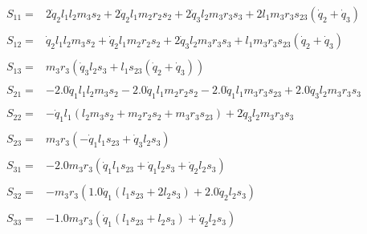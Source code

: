 \begin{align}
    \begin{split}
        S_{11} =& 2 \dot{q}_2 l_{1} l_{2} m_{3} s_{2} + 2 \dot{q}_2 l_{1} m_{2} r_{2} s_{2} + 2 \dot{q}_3 l_{2} m_{3} r_{3} s_{3} + 2 l_{1} m_{3} r_{3} s_{23} \left(\dot{q}_2 + \dot{q}_3\right)
    \end{split}
    \nonumber \\
    \begin{split}
        S_{12} =& \dot{q}_2 l_{1} l_{2} m_{3} s_{2} + \dot{q}_2 l_{1} m_{2} r_{2} s_{2} + 2 \dot{q}_3 l_{2} m_{3} r_{3} s_{3} + l_{1} m_{3} r_{3} s_{23} \left(\dot{q}_2 + \dot{q}_3\right)
    \end{split}
    \nonumber \\
    \begin{split}
        S_{13} =& m_{3} r_{3} \left(\dot{q}_3 l_{2} s_{3} + l_{1} s_{23} \left(\dot{q}_2 + \dot{q}_3\right)\right)
    \end{split}
    \\
    \begin{split}
        S_{21} =& - 2.0 \dot{q}_1 l_{1} l_{2} m_{3} s_{2} - 2.0 \dot{q}_1 l_{1} m_{2} r_{2} s_{2} - 2.0 \dot{q}_1 l_{1} m_{3} r_{3} s_{23} + 2.0 \dot{q}_3 l_{2} m_{3} r_{3} s_{3}
    \end{split}
    \nonumber \\
    \begin{split}
        S_{22} =& - \dot{q}_1 l_{1} \left(l_{2} m_{3} s_{2} + m_{2} r_{2} s_{2} + m_{3} r_{3} s_{23}\right) + 2 \dot{q}_3 l_{2} m_{3} r_{3} s_{3}
    \end{split}
    \nonumber \\
    \begin{split}
        S_{23} =& m_{3} r_{3} \left(- \dot{q}_1 l_{1} s_{23} + \dot{q}_3 l_{2} s_{3}\right)
    \end{split}
    \\
    \begin{split}
        S_{31} =& - 2.0 m_{3} r_{3} \left(\dot{q}_1 l_{1} s_{23} + \dot{q}_1 l_{2} s_{3} + \dot{q}_2 l_{2} s_{3}\right)
    \end{split}
    \nonumber \\
    \begin{split}
        S_{32} =& - m_{3} r_{3} \left(1.0 \dot{q}_1 \left(l_{1} s_{23} + 2 l_{2} s_{3}\right) + 2.0 \dot{q}_2 l_{2} s_{3}\right)
    \end{split}
    \nonumber \\
    \begin{split}
        S_{33} =& - 1.0 m_{3} r_{3} \left(\dot{q}_1 \left(l_{1} s_{23} + l_{2} s_{3}\right) + \dot{q}_2 l_{2} s_{3}\right)
    \end{split}
\end{align}

